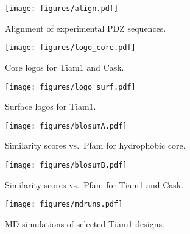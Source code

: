 \documentclass[12pt]{article}
\begin{document}
\begin{figure}[!h]
\begin{center}
\vspace*{-2cm}
\texttt{[image: figures/align.pdf]}
\end{center}
\caption[width=1cm]{Alignment of experimental PDZ sequences.}
\end{figure}

\begin{figure}[!h]
\begin{center}
\vspace*{-2cm}
\texttt{[image: figures/logo\_core.pdf]}
\end{center}
\caption[width=1cm]{Core logos for Tiam1 and Cask.}
\end{figure}

\begin{figure}[!h]
\begin{center}
\vspace*{-2cm}
\texttt{[image: figures/logo\_surf.pdf]}
\end{center}
\caption[width=1cm]{Surface logos for Tiam1.}
\end{figure}

\begin{figure}[!h]
\begin{center}
\vspace*{-1cm}
\texttt{[image: figures/blosumA.pdf]}
\end{center}
\caption[width=1cm]{Similarity scores vs.\ Pfam for hydrophobic core.}
\end{figure}


\begin{figure}[!h]
\begin{center}
\vspace*{-1cm}
\texttt{[image: figures/blosumB.pdf]}
\end{center}
\caption[width=1cm]{Similarity scores vs.\ Pfam for Tiam1 and Cask.}
\end{figure}


\begin{figure}[!h]
\begin{center}
\vspace*{-1cm}
\texttt{[image: figures/mdruns.pdf]} 
\end{center}
\caption[width=1cm]{MD simulations of selected Tiam1 designs.}
\end{figure}
\end{document}
